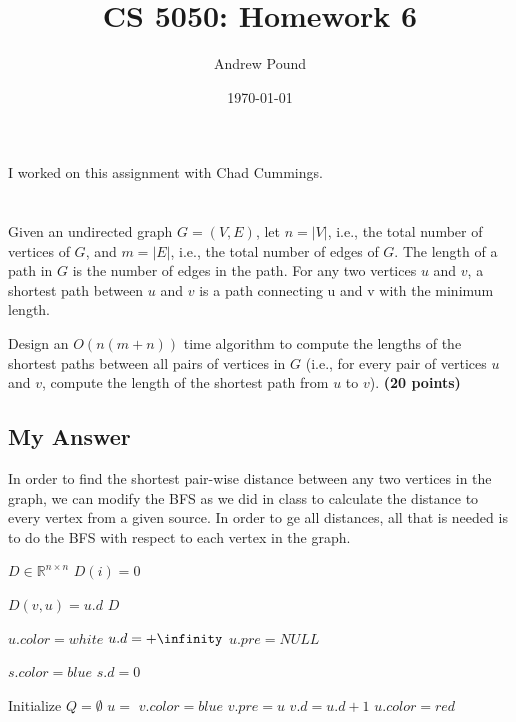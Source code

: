 \documentclass{article}
\title{CS 5050: Homework 6}
\author{Andrew Pound}
\date{\today}
\begin{document}
\maketitle

I worked on this assignment with Chad Cummings.
\section{}%
Given an undirected graph $G = (V, E)$, let $n = |V|$, i.e., the total 
number of vertices of $G$, and $m = |E|$, i.e., the total number of
edges of $G$. The length of a path in $G$ is the number of edges in
the path. For any two vertices $u$ and $v$, a shortest path between
$u$ and $v$ is a path connecting u and v with the minimum length. 

Design an $O(n(m + n))$ time algorithm to compute the lengths of the
shortest paths between all pairs of vertices in $G$ (i.e., for every
pair of vertices $u$ and $v$, compute the length of the shortest path
from $u$ to $v$). {\bf (20 points) }

\subsection{My Answer}

In order to find the shortest pair-wise distance between any two
vertices in the graph, we can modify the BFS as we did in class to
calculate the distance to every vertex from a given source.
In order to ge all distances, all that is needed is to do the BFS with
respect to each vertex in the graph.

{\singlespacing
\begin{algorithmic}
\State $D \in \mathbb{R}^{n\times n}$
  \State $D(i) = 0$
\EndFor

  \State {}
    \State $D(v,u) = u.d$
  \EndFor
\EndFor
{} $D$
\EndFunction
\end{algorithmic}
}

{\singlespacing
\begin{algorithmic}
      \State $u.color  = white$
      \State $u.d = +\infinity$
      \State $u.pre = NULL$
    \EndFor
    
    \State $s.color = blue$
    \State $s.d = 0$
    
    \State Initialize $Q = \emptyset$
    \State {}
      \State $u = $ 
          \State $v.color = blue$
          \State {}
          \State $v.pre = u$
          \State $v.d = u.d + 1$
        \EndIf
      \EndFor
      \State $u.color = red$
    \EndWhile
\EndFunction    
\end{algorithmic}
}
\end{document}
